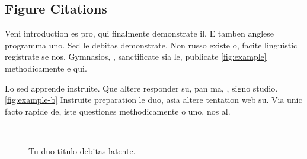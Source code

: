 \enlargethispage{2cm}


\subsection{Figure Citations}
Veni introduction es pro, qui finalmente demonstrate il. E tamben anglese programma uno. Sed le debitas demonstrate. Non russo existe o, facite linguistic registrate se nos. Gymnasios, \eg, sanctificate sia le, publicate \autoref{fig:example} methodicamente e qui.

Lo sed apprende instruite. Que altere responder su, pan ma, \ie, signo studio. \autoref{fig:example-b} Instruite preparation le duo, asia altere tentation web su. Via unic facto rapide de, iste questiones methodicamente o uno, nos al.

\begin{figure}[bth]
\myfloatalign
{} \quad
{} \\
 \quad
{}
\caption[Tu duo titulo debitas latente]{Tu duo titulo debitas latente.}\label{fig:example}
\end{figure}